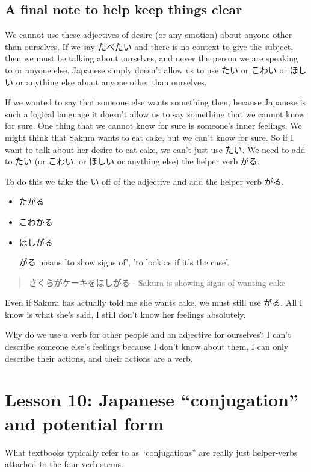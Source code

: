 \documentclass[11pt]{article}
\begin{document}
\subsection{A final note to help keep things clear}
\label{sec:org371ea4d}
We cannot use these adjectives of desire (or any emotion) about anyone other than ourselves. If we say たべたい and there is no context to give the subject, then we must be talking about ourselves, and never the person we are speaking to or anyone else. Japanese simply doesn't allow us to use たい or こわい or ほしい or anything else about anyone other than ourselves.

If we wanted to say that someone else wants something then, because Japanese is such a logical language it doesn't allow us to say something that we cannot know for sure. One thing that we cannot know for sure is someone's inner feelings. We might think that Sakura wants to eat cake, but we can't know for sure. So if I want to talk about her desire to eat cake, we can't just use たい. We need to add to たい (or こわい, or ほしい or anything else) the helper verb がる.

To do this we take the い off of the adjective and add the helper verb がる.
\begin{itemize}
\item たがる
\item こわかる
\item ほしがる

がる means 'to show signs of', 'to look as if it's the case'.
\end{itemize}
\begin{quote}
さくらがケーキをほしがる - Sakura is showing signs of wanting cake
\end{quote}
Even if Sakura has actually told me she wants cake, we must still use がる. All I know is what she's said, I still don't know her feelings absolutely.

Why do we use a verb for other people and an adjective for ourselves? I can't describe someone else's feelings because I don't know about them, I can only describe their actions, and their actions are a verb.
\section{Lesson 10: Japanese ``conjugation'' and potential form}
\label{sec:org98f97c4}
What textbooks typically refer to as ``conjugations'' are really just helper-verbs attached to the four verb stems.
\end{document}
